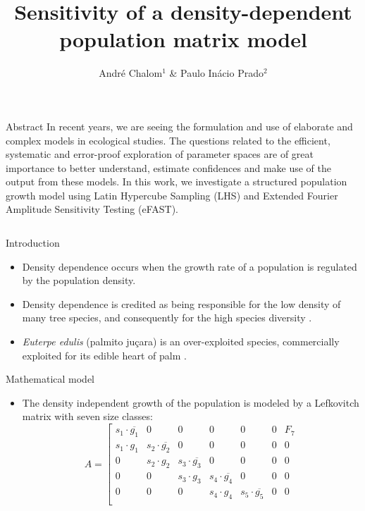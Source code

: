 \documentclass[final]{beamer}
\title{Sensitivity of a density-dependent population matrix model}
\author{Andr\'e Chalom$^1$ \& Paulo In\'acio Prado$^2$}
\institute{$^1$ Programa Interunidades de Pós-Graduação em Bioinformática, 
 $^2$ Instituto de Biociências, Universidade de São Paulo, Brasil.}
\begin{document}
  \begin{frame}{} 
    \vfill
    \begin{block}{\large Abstract}
In recent years, we are seeing the formulation and use of
elaborate and complex models in ecological studies.
The questions related to the efficient, systematic and error-proof
exploration of parameter spaces are of great importance to better understand,
estimate confidences and make use of the output from these models. 
In this work,
we investigate a structured population growth model
using Latin Hypercube Sampling (LHS) and Extended Fourier Amplitude Sensitivity
Testing (eFAST).
    \end{block}
    \vfill
    \begin{columns}[t]
      \begin{column}{.48\linewidth}
        \begin{block}{Introduction}
          \begin{itemize}
		  \item Density dependence occurs when the growth rate of a population is regulated by the population density.
          \item Density dependence is credited as being responsible for the low density of many tree species, and consequently for the high species diversity \cite{Janzen70, Connel71}.
          \item {\em Euterpe edulis} (palmito ju\c cara) is an over-exploited species, commercially exploited for its edible heart of palm \cite{Pollak95}.
          \end{itemize}
        \end{block}
    \vfill
        \begin{block}{Mathematical model}
          \begin{itemize}
          \item The density independent growth of the population is modeled by a Lefkovitch matrix with seven size classes:
\begin{equation}
A = \left[
\begin{array} {ccccccc}
s_1 \cdot \overline{g_1} &   0 &   0 &   0 &   0 &   0 & F_7 \\
s_1 \cdot g_1 & s_2 \cdot \overline{g_2} &   0 &   0 &   0 &   0 &   0 \\
0 & s_2 \cdot g_2 & s_3 \cdot \overline{g_3} &   0 &   0 &   0 &   0 \\
0 &   0 & s_3 \cdot g_3 & s_4 \cdot \overline{g_4} &   0 &   0 &   0 \\
0 &   0 &   0 & s_4 \cdot g_4 & s_5 \cdot \overline{g_5} &   0 &   0 \\

\end{array}
\end{equation}
\end{itemize}
\end{block}
\end{column}
\end{columns}
\end{frame}
\end{document}
